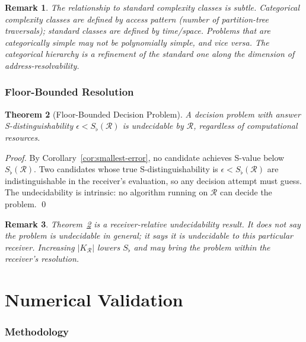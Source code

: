 \documentclass[twocolumn,a4paper]{article}
\newtheorem{theorem}{Theorem}[section]
\newtheorem{remark}[theorem]{Remark}
\newcommand{\receiver}{\mathcal{R}}
\newcommand{\Sfloor}{S_{\flat}}
\begin{document}
\begin{remark}
The relationship to standard complexity classes is subtle. Categorical complexity classes are defined by access pattern (number of partition-tree traversals); standard classes are defined by time/space. Problems that are categorically simple may not be polynomially simple, and vice versa. The categorical hierarchy is a refinement of the standard one along the dimension of address-resolvability.
\end{remark}

\section{Floor-Bounded Resolution}
\label{sec:floor-resolution}

\begin{theorem}[Floor-Bounded Decision Problem]
\label{thm:floor-decision}
A decision problem with answer S-distinguishability $\epsilon<\Sfloor(\receiver)$ is undecidable by $\receiver$, regardless of computational resources.
\end{theorem}

\begin{proof}
By Corollary~\ref{cor:smallest-error}, no candidate achieves S-value below $\Sfloor(\receiver)$. Two candidates whose true S-distinguishability is $\epsilon<\Sfloor(\receiver)$ are indistinguishable in the receiver's evaluation, so any decision attempt must guess. The undecidability is intrinsic: no algorithm running on $\receiver$ can decide the problem. \qed
\end{proof}

\begin{remark}
Theorem~\ref{thm:floor-decision} is a receiver-relative undecidability result. It does not say the problem is undecidable in general; it says it is undecidable to this particular receiver. Increasing $|K_{\receiver}|$ lowers $\Sfloor$ and may bring the problem within the receiver's resolution.
\end{remark}

\part{Numerical Validation}

\section{Methodology}
\label{sec:val-methodology}
\end{document}

